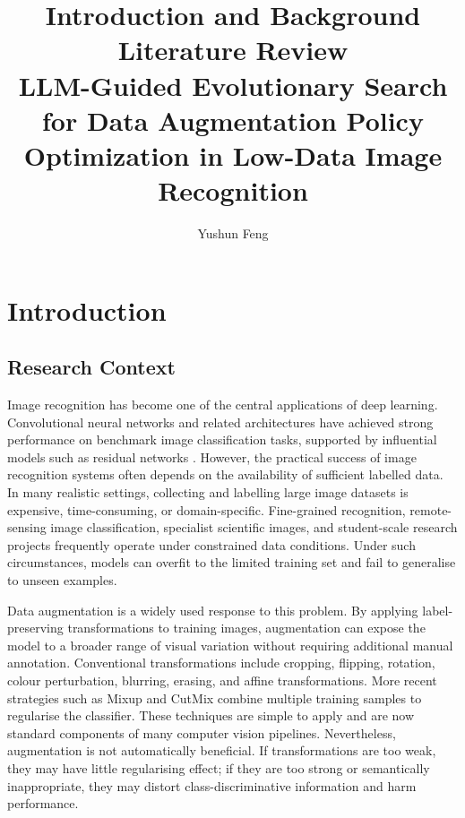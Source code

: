 \documentclass[12pt,a4paper]{report}
\title{Introduction and Background Literature Review\\
\large LLM-Guided Evolutionary Search for Data Augmentation Policy Optimization in Low-Data Image Recognition}
\author{Yushun Feng}
\date{}
\begin{document}
\maketitle

\chapter{Introduction}

\section{Research Context}

Image recognition has become one of the central applications of deep learning. Convolutional neural networks and related architectures have achieved strong performance on benchmark image classification tasks, supported by influential models such as residual networks \citep{he2016deep}. However, the practical success of image recognition systems often depends on the availability of sufficient labelled data. In many realistic settings, collecting and labelling large image datasets is expensive, time-consuming, or domain-specific. Fine-grained recognition, remote-sensing image classification, specialist scientific images, and student-scale research projects frequently operate under constrained data conditions. Under such circumstances, models can overfit to the limited training set and fail to generalise to unseen examples.

Data augmentation is a widely used response to this problem. By applying label-preserving transformations to training images, augmentation can expose the model to a broader range of visual variation without requiring additional manual annotation. Conventional transformations include cropping, flipping, rotation, colour perturbation, blurring, erasing, and affine transformations. More recent strategies such as Mixup \citep{zhang2018mixup} and CutMix \citep{yun2019cutmix} combine multiple training samples to regularise the classifier. These techniques are simple to apply and are now standard components of many computer vision pipelines. Nevertheless, augmentation is not automatically beneficial. If transformations are too weak, they may have little regularising effect; if they are too strong or semantically inappropriate, they may distort class-discriminative information and harm performance.
\end{document}
